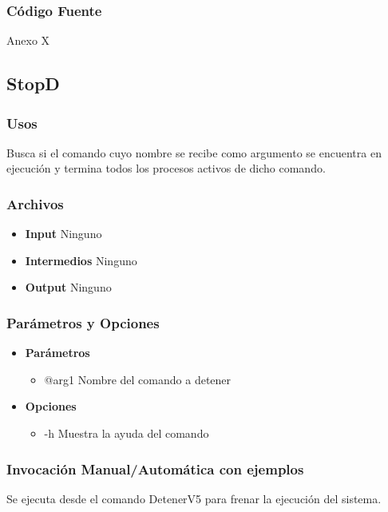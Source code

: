 \documentclass[a4paper,10pt,titlepage]{article}
\begin{document}
		\subsubsection{C\'odigo Fuente}
			Anexo X


	\subsection{StopD}
		\subsubsection{Usos}

		Busca si el comando cuyo nombre se recibe como argumento se encuentra en ejecuci\'on y termina todos los procesos activos de dicho comando.


		\subsubsection{Archivos}
			\begin {itemize}
				\item \textbf{Input } {Ninguno}
				\item \textbf{Intermedios } {Ninguno}
				\item \textbf{Output } {Ninguno}
			\end{itemize}

		\subsubsection{Par\'ametros y Opciones}
			\begin {itemize}
				\item \textbf{Par\'ametros} {
					\begin{itemize}
						\item {@arg1 }{Nombre del comando a detener}
					\end{itemize}
				}
				\item \textbf{Opciones}{
					\begin{itemize}
						\item {-h }{Muestra la ayuda del comando} 
					\end{itemize}
				}

			\end{itemize}
	
		\subsubsection{Invocaci\'on Manual/Autom\'atica con ejemplos}
			Se ejecuta desde el comando DetenerV5 para frenar la ejecuci\'on del sistema. 
	
\end{document}
